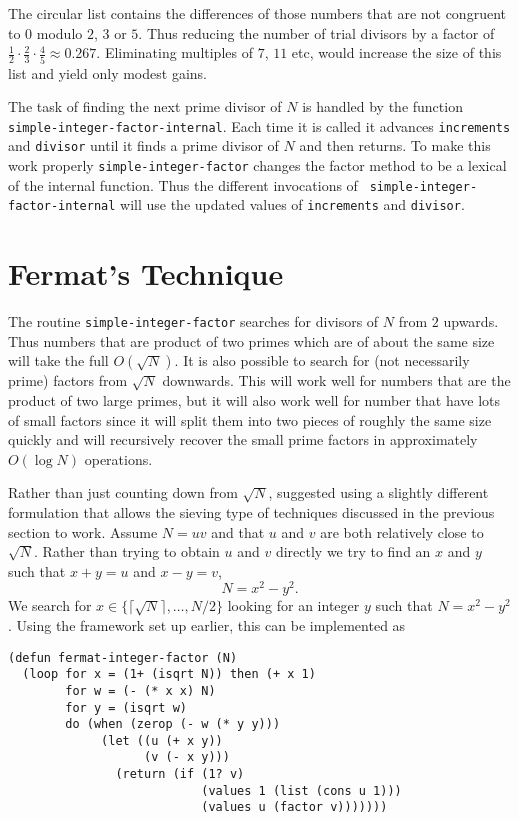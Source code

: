The circular list contains the differences of those numbers that are not
congruent to $0$ modulo $2$, $3$ or $5$.  Thus reducing the number of trial
divisors by a factor of $\frac{1}{2}\cdot\frac{2}{3}\cdot\frac{4}{5}
\approx 0.267$.  Eliminating multiples of $7$, $11$ etc, would increase the
size of this list and yield only modest gains.

The task of finding the next prime divisor of $N$ is handled by the function
{\tt simple-integer-factor-internal}.  Each time it is called it advances
{\tt incre\-ments} and {\tt divisor} until it finds a prime divisor of $N$
and then returns.  To make this work properly {\tt simple-integer-factor}
changes the factor method to be a lexical of the internal function.  Thus
the different invocations of {\tt
simple-integer-\discretionary{}{}{}factor-internal} will use the updated
values of {\tt increments} and {\tt divisor}.

\section{Fermat's Technique}

The routine {\tt simple-integer-factor} searches for divisors of $N$ from
$2$ upwards.  Thus numbers that are product of two primes which are of
about the same size will take the full $O(\sqrt{N})$.  It is also possible
to search for (not necessarily prime) factors from $\sqrt{N}$ downwards.
This will work well for numbers that are the product of two large primes,
but it will also work well for number that have lots of small factors since
it will split them into two pieces of roughly the same size quickly and
will recursively recover the small prime factors in approximately $O(\log
N)$ operations.

Rather than just counting down from $\sqrt{N}$, {\Fermat} suggested using a
slightly different formulation that allows the sieving type of techniques
discussed in the previous section to work.  Assume $N = uv$ and that $u$
and $v$ are both relatively close to $\sqrt{N}$.  Rather than trying to
obtain $u$ and $v$ directly we try to find an $x$ and $y$ such that $x+y =
u$ and $x-y = v$, \ie
\[
N = x^{2} - y^{2}.
\]
We search for $x \in \{\lceil{\sqrt{N}}\rceil, \ldots, N/2\}$ looking for an
integer $y$ such that $N = x^{2} - y^{2}$.  Using the framework set up
earlier, this can be implemented as
\begin{verbatim}
(defun fermat-integer-factor (N)
  (loop for x = (1+ (isqrt N)) then (+ x 1)
        for w = (- (* x x) N) 
        for y = (isqrt w)
        do (when (zerop (- w (* y y)))
             (let ((u (+ x y))
                   (v (- x y)))
               (return (if (1? v)
                           (values 1 (list (cons u 1)))
                           (values u (factor v)))))))
\end{verbatim}

